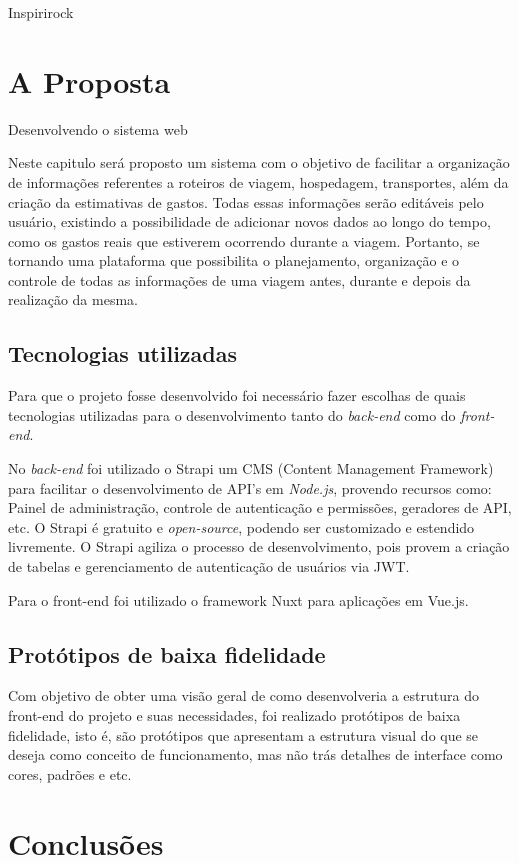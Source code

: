 \documentclass[cic,tc]{iiufrgs}
\begin{document}
Inspirirock

\chapter{A Proposta}
Desenvolvendo o sistema web

Neste capitulo será proposto um sistema com o objetivo de facilitar a organização de informações referentes a roteiros de viagem, hospedagem, transportes, além da criação da estimativas de gastos. Todas essas informações serão editáveis pelo usuário, existindo a possibilidade de adicionar novos dados ao longo do tempo, como os gastos reais que estiverem ocorrendo durante a viagem. Portanto, se tornando uma plataforma que possibilita o planejamento, organização e o controle de todas as informações de uma viagem antes, durante e depois da realização da mesma. 

\section{Tecnologias utilizadas}
Para que o projeto fosse desenvolvido foi necessário fazer escolhas de quais tecnologias utilizadas para o desenvolvimento tanto do \textit{back-end} como do \textit{front-end}.

No \textit{back-end} foi utilizado o Strapi um CMS (Content Management Framework) para facilitar o desenvolvimento de API's em \textit{Node.js}, provendo recursos como: Painel de administração, controle de autenticação e permissões, geradores de API, etc. O Strapi é gratuito e \textit{open-source}, podendo ser customizado e estendido livremente. O Strapi agiliza o processo de desenvolvimento, pois provem a criação de tabelas e gerenciamento de autenticação de usuários via JWT.

Para o front-end foi utilizado o framework Nuxt para aplicações em Vue.js.

\section{Protótipos de baixa fidelidade}
Com objetivo de obter uma visão geral de como desenvolveria a estrutura do front-end do projeto e suas necessidades, foi realizado protótipos de baixa fidelidade, isto é, são protótipos que apresentam a estrutura visual do que se deseja como conceito de funcionamento, mas não trás detalhes de interface como cores, padrões e etc.


\chapter{Conclusões}
\end{document}
